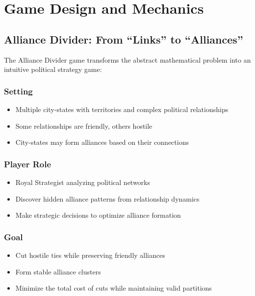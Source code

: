 \documentclass[english]{tudscrreprt}
\begin{document}
\section{Game Design and Mechanics}

\subsection{Alliance Divider: From ``Links'' to ``Alliances''}
The Alliance Divider game transforms the abstract mathematical problem into an intuitive political strategy game:

\subsubsection{Setting}
\begin{itemize}
  \item Multiple city-states with territories and complex political relationships
  \item Some relationships are friendly, others hostile
  \item City-states may form alliances based on their connections
\end{itemize}

\subsubsection{Player Role}
\begin{itemize}
  \item Royal Strategist analyzing political networks
  \item Discover hidden alliance patterns from relationship dynamics
  \item Make strategic decisions to optimize alliance formation
\end{itemize}

\subsubsection{Goal}
\begin{itemize}
  \item Cut hostile ties while preserving friendly alliances
  \item Form stable alliance clusters
  \item Minimize the total cost of cuts while maintaining valid partitions
\end{itemize}
\end{document}
